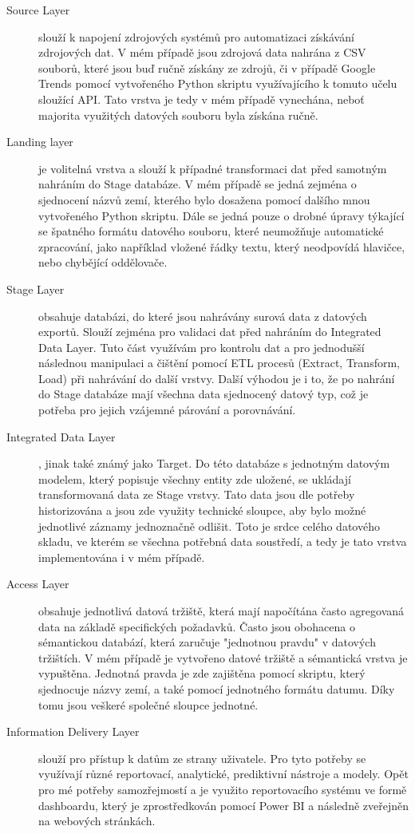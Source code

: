 \documentclass[thesis=M,czech]{FITthesis}[2022/10/08]
\begin{document}
\begin{description}
    \item[Source Layer] slouží k napojení zdrojových systémů pro automatizaci získávání zdrojových dat. V mém případě jsou zdrojová data nahrána z CSV souborů, které jsou buď ručně získány ze zdrojů, či v případě Google Trends pomocí vytvořeného Python skriptu využívajícího k tomuto učelu sloužící API. Tato vrstva je tedy v mém případě vynechána, neboť majorita využitých datových souboru byla získána ručně. \cite{EDW-C1}
    
    \item[Landing layer] je volitelná vrstva a slouží k případné transformaci dat před samotným nahráním do Stage databáze. V mém případě se jedná zejména o sjednocení názvů zemí, kterého bylo dosažena pomocí dalšího mnou vytvořeného Python skriptu. Dále se jedná pouze o drobné úpravy týkající se špatného formátu datového souboru, které neumožňuje automatické zpracování, jako například vložené řádky textu, který neodpovídá hlavičce, nebo chybějící oddělovače. \cite{EDW-C1}
    
    \item[Stage Layer] obsahuje databázi, do které jsou nahrávány surová data z datových exportů. Slouží zejména pro validaci dat před nahráním do Integrated Data Layer. Tuto část využívám pro kontrolu dat a pro jednodušší následnou manipulaci a čištění pomocí ETL procesů (Extract, Transform, Load) při nahrávání do další vrstvy. Další výhodou je i to, že po nahrání do Stage databáze mají všechna data sjednocený datový typ, což je potřeba pro jejich vzájemné párování a porovnávání.  \cite{EDW-C1}
    
    \item[Integrated Data Layer], jinak také známý jako Target.  Do této databáze s jednotným datovým modelem, který popisuje všechny entity zde uložené, se ukládají transformovaná data ze Stage vrstvy. Tato data jsou dle potřeby historizována a jsou zde využity technické sloupce, aby bylo možné jednotlivé záznamy jednoznačně odlišit. Toto je srdce celého datového skladu, ve kterém se všechna potřebná data soustředí, a tedy je tato vrstva implementována i v mém případě.  \cite{EDW-C1}
    
    \item[Access Layer] obsahuje jednotlivá datová tržiště, která mají napočítána často agregovaná data na základě specifických požadavků. Často jsou obohacena o sémantickou databází, která zaručuje "jednotnou pravdu" v datových tržištích. V mém případě je vytvořeno datové tržiště a sémantická vrstva je vypuštěna. Jednotná pravda je zde zajištěna pomocí skriptu, který sjednocuje názvy zemí, a také pomocí jednotného formátu datumu. Díky tomu jsou veškeré společné sloupce jednotné.  \cite{EDW-C1}
    
    \item[Information Delivery Layer] slouží pro přístup k datům ze strany uživatele. Pro tyto potřeby se využívají různé reportovací, analytické, prediktivní nástroje a modely. Opět pro mé potřeby samozřejmostí a je využito reportovacího systému ve formě dashboardu, který je zprostředkován pomocí Power BI a následně zveřejněn na webových stránkách.  \cite{EDW-C1}
\end{description}
\end{document}

